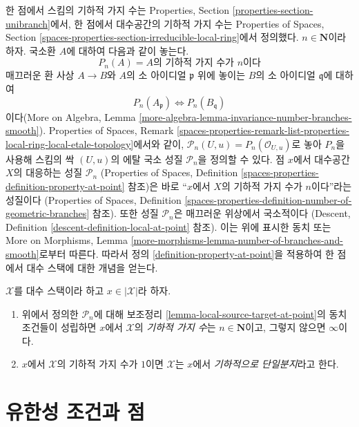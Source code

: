 \noindent
한 점에서 스킴의 기하적 가지 수는 Properties, Section
\ref{properties-section-unibranch}에서, 한 점에서 대수공간의 기하적 가지 수는
Properties of Spaces, Section
\ref{spaces-properties-section-irreducible-local-ring}에서 정의했다.
$n \in \mathbf{N}$이라 하자. 국소환 $A$에 대하여 다음과 같이 놓는다.
$$
P_n(A) = A\text{의 기하적 가지 수가 }n\text{이다}
$$
매끄러운 환 사상 $A \to B$와 $A$의 소 아이디얼 $\mathfrak p$ 위에 놓이는
$B$의 소 아이디얼 $\mathfrak q$에 대하여
$$
P_n(A_\mathfrak p) \Leftrightarrow P_n(B_\mathfrak q)
$$
이다(More on Algebra, Lemma
\ref{more-algebra-lemma-invariance-number-branches-smooth}).
Properties of Spaces, Remark
\ref{spaces-properties-remark-list-properties-local-ring-local-etale-topology}에서와 같이,
$\mathcal{P}_n(U, u) = P_n(\mathcal{O}_{U, u})$로 놓아 $P_n$을 사용해
스킴의 싹 $(U, u)$의 에탈 국소 성질 $\mathcal{P}_n$을 정의할 수 있다.
점 $x$에서 대수공간 $X$의 대응하는 성질 $\mathcal{P}_n$
(Properties of Spaces, Definition
\ref{spaces-properties-definition-property-at-point} 참조)은 바로
``$x$에서 $X$의 기하적 가지 수가 $n$이다''라는 성질이다
(Properties of Spaces, Definition
\ref{spaces-properties-definition-number-of-geometric-branches} 참조).
또한 성질 $\mathcal{P}_n$은 매끄러운 위상에서 국소적이다
(Descent, Definition \ref{descent-definition-local-at-point} 참조).
이는 위에 표시한 동치 또는 More on Morphisms,
Lemma \ref{more-morphisms-lemma-number-of-branches-and-smooth}로부터 따른다.
따라서 정의 \ref{definition-property-at-point}을 적용하여 한 점에서
대수 스택에 대한 개념을 얻는다.

\begin{definition}
\label{definition-number-of-geometric-branches}
$\mathcal{X}$를 대수 스택이라 하고 $x \in |\mathcal{X}|$라 하자.
\begin{enumerate}
\item 위에서 정의한 $\mathcal{P}_n$에 대해 보조정리
\ref{lemma-local-source-target-at-point}의 동치 조건들이 성립하면
{$x$에서 $\mathcal{X}$의 \it 기하적 가지 수}는 $n \in \mathbf{N}$이고,
그렇지 않으면 $\infty$이다.
\item $x$에서 $\mathcal{X}$의 기하적 가지 수가 $1$이면
$\mathcal{X}$는 {$x$에서 \it 기하적으로 단일분지}라고 한다.
\end{enumerate}
\end{definition}






\section{유한성 조건과 점}
\label{section-points-conditions}

